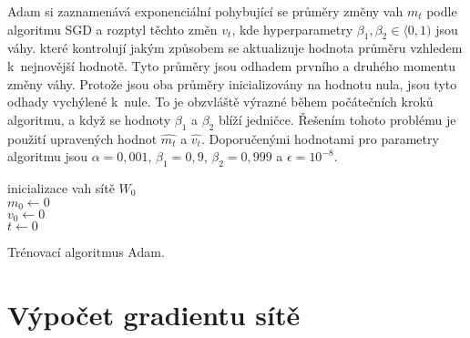 Adam si zaznamenává exponenciální pohybující se průměry změny vah $m_{t}$ podle algoritmu SGD a rozptyl těchto změn $v_{t}$, kde hyperparametry $\beta_1, \beta_2 \in \langle 0,1 )$ jsou váhy. které kontrolují jakým způsobem se aktualizuje hodnota průměru vzhledem k~nejnovější hodnotě.
Tyto průměry jsou odhadem prvního a druhého momentu změny váhy.
Protože jsou oba průměry inicializovány na hodnotu nula, jsou tyto odhady vychýlené k~nule.
To je obzvláště výrazné během počátečních kroků algoritmu, a když se hodnoty $\beta_1$ a $\beta_2$ blíží jedničce.
Řešením tohoto problému je použití upravených hodnot $\hat{m_{t}}$ a $\hat{v_{t}}$.
Doporučenými hodnotami pro parametry algoritmu jsou $\alpha=0,001$, $\beta_{1}=0,9$, $\beta_{2}=0,999$ a $\epsilon=10^{-8}$.

\begin{algorithm}
    \SetAlgoLined
    inicializace vah sítě $W_0$\\
    $m_0 \leftarrow 0$\\
    $v_0 \leftarrow 0$\\
    $t \leftarrow 0$\\
\caption{Trénovací algoritmus Adam.}
\label{alg:adam}
\end{algorithm}

\section{Výpočet gradientu sítě}
\label{sec:grad}

